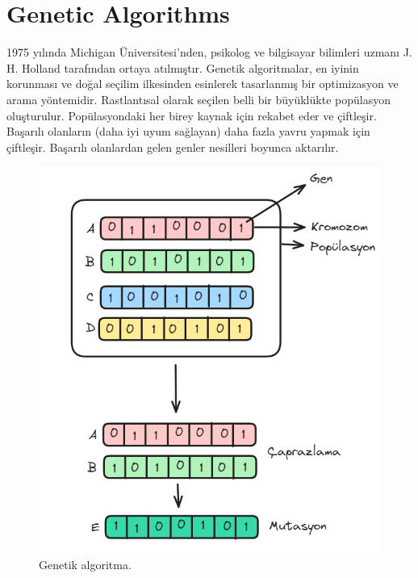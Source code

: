 \section{Genetic Algorithms}
1975 yılında Michigan Üniversitesi'nden, psikolog ve bilgisayar bilimleri uzmanı J. H. Holland tarafından ortaya atılmıştır. Genetik algoritmalar, en iyinin korunması ve doğal seçilim ilkesinden esinlerek tasarlanmış bir optimizasyon ve arama yöntemidir. Rastlantısal olarak seçilen belli bir büyüklükte popülasyon oluşturulur. Popülasyondaki her birey kaynak için rekabet eder ve çiftleşir. Başarılı olanların (daha iyi uyum sağlayan) daha fazla yavru yapmak için çiftleşir. Başarılı olanlardan gelen genler nesilleri boyunca aktarılır. 

\begin{figure}[h]
    \centering
    \includegraphics[width=1\textwidth]{images/genetic_algorithm.png}
    \caption{Genetik algoritma.}
    \label{fig:enter-label}
\end{figure}

